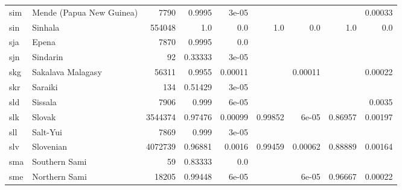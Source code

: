 \documentclass[11pt]{article}
\begin{document}
\begin{table*}[h]
{\begin{tabular}{llrrrrrrr}
sim         & Mende (Papua New Guinea)         & 7790         & 0.9995         & 3e-05         &          &          &          & 0.00033         \\

sin         & Sinhala         & 554048         & 1.0         & 0.0         & 1.0         & 0.0         & 1.0         & 0.0         \\

sja         & Epena         & 7870         & 0.9995         & 0.0         &          &          &          &          \\

sjn         & Sindarin         & 92         & 0.33333         & 3e-05         &          &          &          &          \\

skg         & Sakalava Malagasy         & 56311         & 0.9955         & 0.00011         &          & 0.00011         &          & 0.00022         \\

skr         & Saraiki         & 134         & 0.51429         & 3e-05         &          &          &          &          \\

sld         & Sissala         & 7906         & 0.999         & 6e-05         &          &          &          & 0.0035         \\

slk         & Slovak         & 3544374         & 0.97476         & 0.00099         & 0.99852         & 6e-05         & 0.86957         & 0.00197         \\

sll         & Salt-Yui         & 7869         & 0.999         & 3e-05         &          &          &          &          \\

slv         & Slovenian         & 4072739         & 0.96881         & 0.0016         & 0.99459         & 0.00062         & 0.88889         & 0.00164         \\

sma         & Southern Sami         & 59         & 0.83333         & 0.0         &          &          &          &          \\

sme         & Northern Sami         & 18205         & 0.99448         & 6e-05         &          & 6e-05         & 0.96667         & 0.00022         \\


\end{tabular}}
\end{table*}
\end{document}
